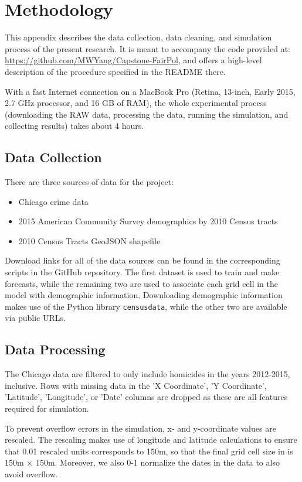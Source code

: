 \chapter{Methodology} \label{app:methodology}

This appendix describes the data collection, data cleaning, and simulation process of the present research. It is meant to accompany the code provided at: \url{https://github.com/MWYang/Capstone-FairPol}, and offers a high-level description of the procedure specified in the README there. 

With a fast Internet connection on a MacBook Pro (Retina, 13-inch, Early 2015, 2.7 GHz processor, and 16 GB of RAM), the whole experimental process (downloading the RAW data, processing the data, running the simulation, and collecting results) takes about 4 hours.

\section{Data Collection}

There are three sources of data for the project:
\begin{itemize}
    \item Chicago crime data
    \item 2015 American Community Survey demographics by 2010 Census tracts
    \item 2010 Census Tracts GeoJSON shapefile
\end{itemize}
Download links for all of the data sources can be found in the corresponding scripts in the GitHub repository. The first dataset is used to train \pp and make forecasts, while the remaining two are used to associate each grid cell in the \pp model with demographic information. Downloading demographic information makes use of the Python library \texttt{censusdata}, while the other two are available via public URLs.

\section{Data Processing}

The Chicago data are filtered to only include homicides in the years 2012-2015, inclusive. Rows with missing data in the 'X Coordinate', 'Y Coordinate', 'Latitude', 'Longitude', or 'Date' columns are dropped as these are all features required for simulation.

To prevent overflow errors in the \pp simulation, x- and y-coordinate values are rescaled. The rescaling makes use of longitude and latitude calculations to ensure that 0.01 rescaled units corresponds to 150m, so that the final grid cell size in \pp is 150m $\times$ 150m. Moreover, we also 0-1 normalize the dates in the data to also avoid overflow.

